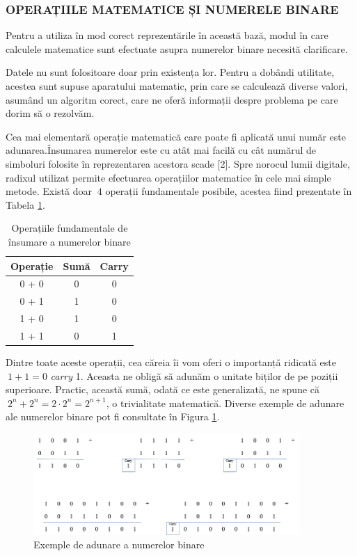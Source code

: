 \documentclass[12pt]{article}
\begin{document}
\subsubsection{OPERAȚIILE MATEMATICE ȘI NUMERELE BINARE}
Pentru a utiliza în mod corect reprezentările în această bază, modul în care calculele matematice sunt efectuate asupra numerelor binare necesită clarificare.

Datele nu sunt folositoare doar prin existența lor. Pentru a dobândi utilitate, acestea sunt supuse aparatului matematic, prin care se calculează diverse valori, asumând un algoritm corect, care ne oferă informații despre problema pe care dorim să o rezolvăm.

Cea mai elementară operație matematică care poate fi aplicată unui număr este adunarea.Însumarea numerelor este cu atât mai facilă cu cât numărul de simboluri folosite în reprezentarea acestora scade [2]. Spre norocul lumii digitale, radixul utilizat permite efectuarea operațiilor matematice în cele mai simple metode. Există doar $\ 4$ operații fundamentale posibile, acestea fiind prezentate în Tabela \ref{Tabela:4}.

\begin{table}[h]
\centering
\begin{tabular}{ ||c|c|c|| }
 \hline
 Operație & Sumă & Carry \\ 
 \hline  \hline
 0 + 0 & 0 & 0\\
 \hline
 0 + 1 & 1  & 0\\
 \hline
 1 + 0 &  1 & 0 \\
 \hline
 1 + 1 & 0 & 1 \\
 \hline
\end{tabular}
\caption{Operațiile fundamentale de însumare a numerelor binare }
\label{Tabela:4}
\end{table}
Dintre toate aceste operații, cea căreia îi vom oferi o importanță ridicată este $\ 1 + 1 = 0$ \textit{carry} 1. Aceasta  ne obligă să adunăm o unitate biților de pe poziții superioare. Practic, această sumă, odată ce este generalizată, ne spune că $\ 2^n + 2^n = 2 \cdot 2^n = 2^{n+1}$, o trivialitate matematică. Diverse exemple de adunare ale numerelor binare pot fi consultate în Figura \ref{Figura:2}.

 \begin{figure}[h!]
 \includegraphics[width=0.9\textwidth]{binary_addition.png}
 \centering
 \caption{Exemple de adunare a numerelor binare}
 \label{Figura:2}
 \end{figure}
\end{document}
